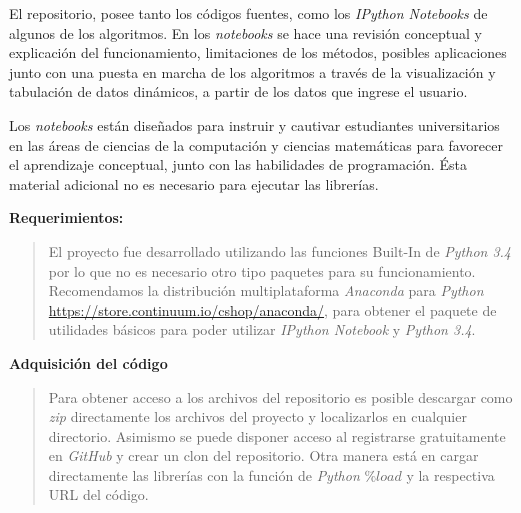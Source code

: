 \documentclass[letterpaper,10pt,oneside]{sphinxmanual}
\theoremstyle{plain}%
\theoremstyle{definition}%
\theoremstyle{remark}%
\begin{document}
El repositorio, posee tanto los códigos fuentes, como los \textit{IPython Notebooks} de algunos de los algoritmos. En los \textit{notebooks} se hace una revisión conceptual y explicación del funcionamiento, limitaciones de los métodos, posibles aplicaciones junto con una puesta en marcha de los algoritmos a través de la visualización y tabulación de datos dinámicos, a partir de los datos que ingrese el usuario.

Los \textit{notebooks} están diseñados para instruir y cautivar estudiantes universitarios en las áreas de ciencias de la computación y ciencias matemáticas para favorecer el aprendizaje conceptual, junto con las habilidades de programación. Ésta material adicional no es necesario para ejecutar las librerías.

\textbf{Requerimientos:}

\begin{quote}
El proyecto fue desarrollado utilizando las funciones Built-In de \textit{Python 3.4} por lo que no es
necesario otro tipo paquetes para su funcionamiento. Recomendamos la distribución multiplataforma \textit{Anaconda} para \textit{Python} \href{https://store.continuum.io/cshop/anaconda/}{https://store.continuum.io/cshop/anaconda/}, para obtener el paquete de utilidades básicos para poder utilizar \textit{IPython Notebook} y \textit{Python 3.4}.
\end{quote}

\textbf{Adquisición del código}

\begin{quote}
Para obtener acceso a los archivos del repositorio es posible descargar como \textit{zip} directamente los archivos del proyecto y localizarlos en cualquier directorio. Asimismo se puede disponer acceso al registrarse gratuitamente en \textit{GitHub} y crear un clon del repositorio. Otra manera está en cargar directamente las librerías con la función de \textit{Python} $\% load$ y la respectiva URL del código.
\end{quote}
\end{document}
